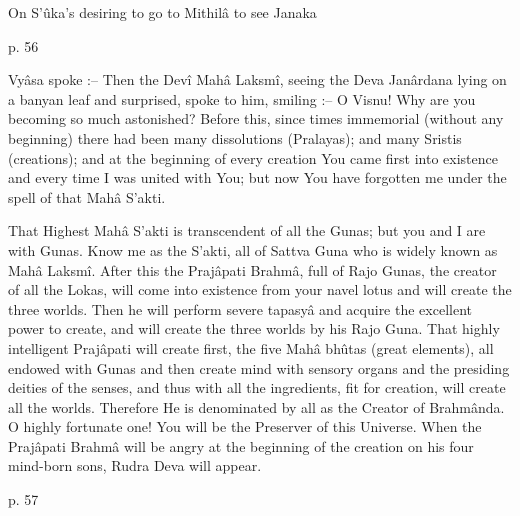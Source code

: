 On S’ûka’s desiring to go to Mithilâ to see Janaka

 

p. 56

 

Vyâsa spoke :-- Then the Devî Mahâ Laksmî, seeing the Deva Janârdana lying on a banyan leaf and surprised, spoke to him, smiling :-- O Visnu! Why are you becoming so much astonished? Before this, since times immemorial (without any beginning) there had been many dissolutions (Pralayas); and many Sristis (creations); and at the beginning of every creation You came first into existence and every time I was united with You; but now You have forgotten me under the spell of that Mahâ S'akti.

 

That Highest Mahâ S'akti is transcendent of all the Gunas; but you and I are with Gunas. Know me as the S’akti, all of Sattva Guna who is widely known as Mahâ Laksmî. After this the Prajâpati Brahmâ, full of Rajo Gunas, the creator of all the Lokas, will come into existence from your navel lotus and will create the three worlds. Then he will perform severe tapasyâ and acquire the excellent power to create, and will create the three worlds by his Rajo Guna. That highly intelligent Prajâpati will create first, the five Mahâ bhûtas (great elements), all endowed with Gunas and then create mind with sensory organs and the presiding deities of the senses, and thus with all the ingredients, fit for creation, will create all the worlds. Therefore He is denominated by all as the Creator of Brahmânda. O highly fortunate one! You will be the Preserver of this Universe. When the Prajâpati Brahmâ will be angry at the beginning of the creation on his four mind-born sons, Rudra Deva will appear.

 

p. 57

 

